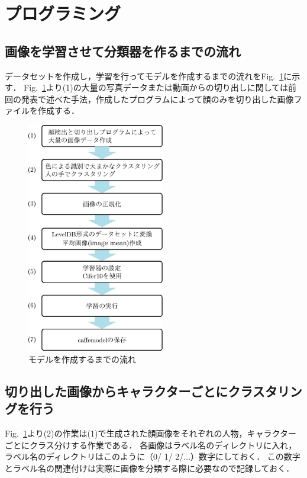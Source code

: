 \documentclass[a4paper,10pt]{jsarticle}
\begin{document}

\section{プログラミング}
\subsection{画像を学習させて分類器を作るまでの流れ}
データセットを作成し，学習を行ってモデルを作成するまでの流れをFig.~\ref{fig:モデルを作成するまでの流れ}に示す．
Fig.~\ref{fig:モデルを作成するまでの流れ}より(1)の大量の写真データまたは動画からの切り出しに関しては前回の発表で述べた手法，作成したプログラムによって顔のみを切り出した画像ファイルを作成する．
\begin{figure}[tb]
  \begin{center}
    \includegraphics[clip,width=6cm]{fig/eps/learning_flow.eps}
  \end{center}
  \caption{モデルを作成するまでの流れ}
  \label{fig:モデルを作成するまでの流れ}
\end{figure}

\subsection{切り出した画像からキャラクターごとにクラスタリングを行う}
Fig.~\ref{fig:モデルを作成するまでの流れ}より(2)の作業は(1)で生成された顔画像をそれぞれの人物，キャラクターごとにクラス分けする作業である．
各画像はラベル名のディレクトリに入れ，ラベル名のディレクトリはこのように（0/ 1/ 2/...）数字にしておく．
この数字とラベル名の関連付けは実際に画像を分類する際に必要なので記録しておく．
\end{document}

